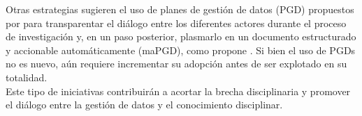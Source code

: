 \documentclass[runningheads]{llncs}
\begin{document}
Otras estrategias sugieren el uso de planes de gestión de datos (PGD) propuestos por \citet{bicarregui2012dmp} para transparentar el diálogo entre los diferentes actores durante el proceso de investigación y, en un paso posterior, plasmarlo en un documento estructurado y accionable automáticamente (maPGD), como propone \citet{simms2019_madmp}. Si bien el uso de PGDs no es nuevo, aún requiere incrementar su adopción antes de ser explotado en su totalidad.\\

Este tipo de iniciativas contribuirán a acortar la brecha disciplinaria y promover el diálogo entre la gestión de datos y el conocimiento disciplinar.\\




\end{document}
